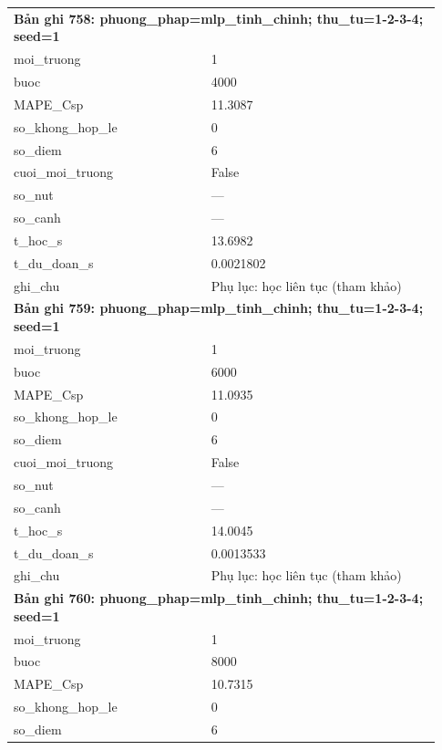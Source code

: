 \begin{longtable}{p{0.43\linewidth}p{0.50\linewidth}}
\midrule
\multicolumn{2}{p{0.95\linewidth}}{\textbf{Bản ghi 758: phuong\_phap=mlp\_tinh\_chinh; thu\_tu=1-2-3-4; seed=1}} \\
moi\_\allowbreak truong & 1 \\
buoc & 4000 \\
MAPE\_\allowbreak Csp & 11.3087 \\
so\_\allowbreak khong\_\allowbreak hop\_\allowbreak le & 0 \\
so\_\allowbreak diem & 6 \\
cuoi\_\allowbreak moi\_\allowbreak truong & False \\
so\_\allowbreak nut & — \\
so\_\allowbreak canh & — \\
t\_\allowbreak hoc\_\allowbreak s & 13.6982 \\
t\_\allowbreak du\_\allowbreak doan\_\allowbreak s & 0.0021802 \\
ghi\_\allowbreak chu & Phụ lục: học liên tục (tham khảo) \\
\midrule
\multicolumn{2}{p{0.95\linewidth}}{\textbf{Bản ghi 759: phuong\_phap=mlp\_tinh\_chinh; thu\_tu=1-2-3-4; seed=1}} \\
moi\_\allowbreak truong & 1 \\
buoc & 6000 \\
MAPE\_\allowbreak Csp & 11.0935 \\
so\_\allowbreak khong\_\allowbreak hop\_\allowbreak le & 0 \\
so\_\allowbreak diem & 6 \\
cuoi\_\allowbreak moi\_\allowbreak truong & False \\
so\_\allowbreak nut & — \\
so\_\allowbreak canh & — \\
t\_\allowbreak hoc\_\allowbreak s & 14.0045 \\
t\_\allowbreak du\_\allowbreak doan\_\allowbreak s & 0.0013533 \\
ghi\_\allowbreak chu & Phụ lục: học liên tục (tham khảo) \\
\midrule
\multicolumn{2}{p{0.95\linewidth}}{\textbf{Bản ghi 760: phuong\_phap=mlp\_tinh\_chinh; thu\_tu=1-2-3-4; seed=1}} \\
moi\_\allowbreak truong & 1 \\
buoc & 8000 \\
MAPE\_\allowbreak Csp & 10.7315 \\
so\_\allowbreak khong\_\allowbreak hop\_\allowbreak le & 0 \\
so\_\allowbreak diem & 6 \\

\end{longtable}
